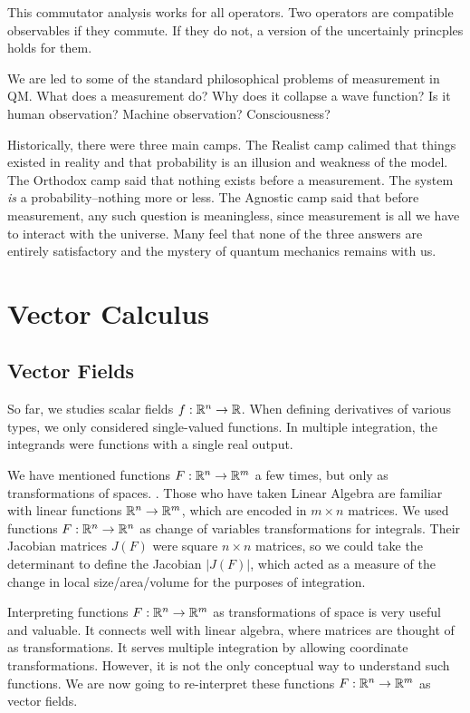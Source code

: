\documentclass[fleqn,letterpaper]{report}
\begin{document}
This commutator analysis works for all operators. Two
operators are compatible observables if they commute. If they
do not, a version of the uncertainly princples holds for
them. 

We are led to some of the standard philosophical problems of
measurement in QM. What does a measurement do? Why does it
collapse a wave function? Is it human observation? Machine
observation? Consciousness? 

Historically, there were three main camps. The Realist camp
calimed that things existed in reality and that probability is
an illusion and weakness of the model. The Orthodox camp said
that nothing exists before a measurement. The system
\emph{is} a probability--nothing more or less. The
Agnostic camp said that before measurement, any such question
is meaningless, since measurement is all we have to interact
with the universe. Many feel that none of the three answers
are entirely satisfactory and the mystery of quantum mechanics
remains with us.

\chapter{Vector Calculus}
\label{vector-calculus}

\section{Vector Fields}
\label{vector-fields}

So far, we studies scalar fields
$f: \mathbb{R}^n \rightarrow \mathbb{R}$. When defining derivatives of
various types, we only considered single-valued functions.
In multiple integration, the integrands were functions
with a single real output. 

We have mentioned functions $F: \mathbb{R}^n \rightarrow \mathbb{R}^m$ a few
times, but only as transformations of spaces. . Those who have
taken Linear Algebra are familiar with linear functions
$\mathbb{R}^n \rightarrow \mathbb{R}^m$, which are encoded in $m \times
n$ matrices. We used functions $F: \mathbb{R}^n \rightarrow \mathbb{R}^n$ as
change of variables transformations for integrals. Their
Jacobian matrices $J(F)$ were square $n \times n$ matrices, so
we could take the determinant to define the Jacobian $|J(F)|$,
which acted as a measure of the change in local
size/area/volume for the purposes of integration.

Interpreting functions $F: \mathbb{R}^n \rightarrow \mathbb{R}^m$ as
transformations of space is very useful and valuable. It
connects well with linear algebra, where matrices are thought
of as transformations. It serves multiple integration by
allowing coordinate transformations. However, it
is not the only conceptual way to understand such functions.
We are now going to re-interpret these functions $F: \mathbb{R}^n
\rightarrow \mathbb{R}^m$ as vector fields.
\end{document}
